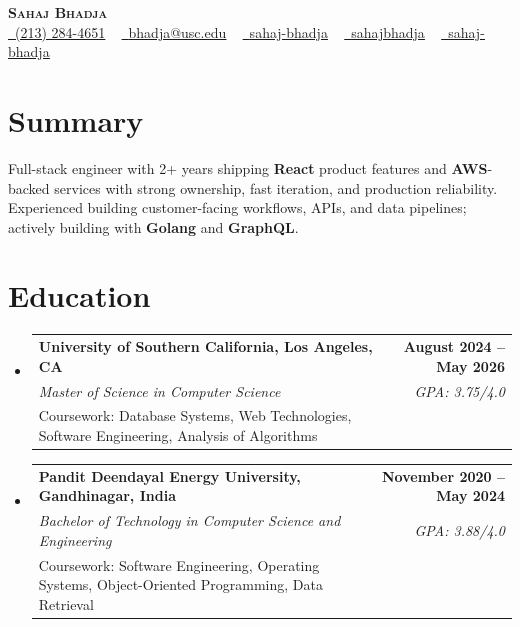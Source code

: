 \documentclass[letterpaper,10pt]{article}
\makeatletter
\newcommand{\resumeEduSubheading}[5]{\vspace{-1pt}\item\begin{tabular*}{1.0\textwidth}[t]{l@{\extracolsep{\fill}}r}\textbf{#1} & \textbf{\small #2} \\\textit{\small #3} & \textit{\small #4} \\\small #5 & \\\end{tabular*}\vspace{-4pt}}
\newcommand{\resumeSubHeadingListStart}{\begin{itemize}[leftmargin=0.0in, label={}]}
\newcommand{\resumeSubHeadingListEnd}{\end{itemize}}
\makeatother
\begin{document}
\begin{center}
{\Huge \scshape \textbf{Sahaj Bhadja}} \\ \vspace{1pt}
\small \href{tel:(213) 284-4651}{\faPhone\ \underline{(213) 284-4651}} ~ \href{mailto:bhadja@usc.edu}{\raisebox{-0.2\height}\faEnvelope\ \underline{bhadja@usc.edu}} ~
\href{https://www.linkedin.com/in/sahaj-bhadja/}{\raisebox{-0.2\height}\faLinkedin\ \underline{sahaj-bhadja}} ~ \href{https://github.com/SAHAJ-BHADJA}{\raisebox{-0.2\height}\faGithub\ \underline{sahajbhadja}} ~
\href{https://sahaj-bhadja.vercel.app/}{\raisebox{-0.2\height}\faGlobe\ \underline{sahaj-bhadja}}
\end{center}
\vspace{-18pt}
\section{Summary}
\begin{itemize}[leftmargin=0.15in, label={}]
\small{\item{Full-stack engineer with 2+ years shipping \textbf{React} product features and \textbf{AWS}-backed services with strong ownership, fast iteration, and production reliability. Experienced building customer-facing workflows, APIs, and data pipelines; actively building with \textbf{Golang} and \textbf{GraphQL}.}}
\end{itemize}
\vspace{-16pt}
\section{Education}
\resumeSubHeadingListStart
\resumeEduSubheading{University of Southern California, Los Angeles, CA}{August 2024 -- May 2026}{Master of Science in Computer Science}{GPA: 3.75/4.0}{Coursework: Database Systems, Web Technologies, Software Engineering, Analysis of Algorithms}
\vspace{-9pt}
\resumeEduSubheading{Pandit Deendayal Energy University, Gandhinagar, India}{November 2020 -- May 2024}{Bachelor of Technology in Computer Science and Engineering}{GPA: 3.88/4.0}{Coursework: Software Engineering, Operating Systems, Object-Oriented Programming, Data Retrieval}
\resumeSubHeadingListEnd
\vspace{-14pt}
\end{document}
